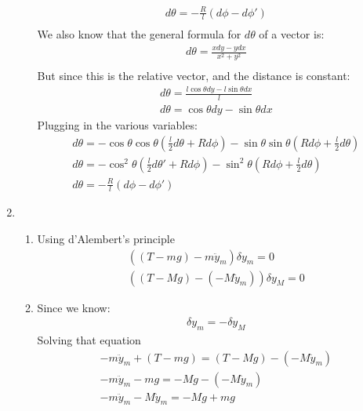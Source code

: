 \documentclass[12pt]{article}
\begin{document}
\begin{enumerate}
\begin{enumerate}
\begin{gather*}
                d\theta=-\frac{R}{l}(d\phi-d\phi')\\
            \end{gather*}
            We also know that the general formula for $d\theta$ of a vector is:
            \begin{gather*}
                d\theta=\frac{xdy-ydx}{x^2+y^2}\\
            \end{gather*}
            But since this is the relative vector, and the distance is constant:
            \begin{gather*}
                d\theta=\frac{l\cos\theta dy-l\sin\theta dx}{l}\\
                d\theta=\cos\theta dy-\sin\theta dx
            \end{gather*}
            Plugging in the various variables:
            \begin{gather*}
                d\theta=-\cos\theta \cos\theta\left(\frac{l}{2}d\theta+Rd\phi\right)-\sin\theta \sin\theta\left(Rd\phi+\frac{l}{2}d\theta\right)\\
                d\theta=-\cos^2\theta\left(\frac{l}{2}d\theta'+Rd\phi\right)- \sin^2\theta\left(Rd\phi+\frac{l}{2}d\theta\right)\\
                d\theta=-\frac{R}{l}(d\phi-d\phi')
            \end{gather*}
        \end{enumerate}
        \item
        \begin{enumerate}
            \item
            Using d'Alembert's principle
            \begin{gather*}
                ((T-mg)-m\ddot{y}_m)\delta y_m=0\\
                ((T-Mg)-(-M\ddot{y}_m))\delta y_M=0
            \end{gather*}
            \item
            Since we know:
            \begin{gather*}
                \delta y_m=-\delta y_M
            \end{gather*}
            Solving that equation
            \begin{gather*}
                -m\ddot{y}_m+(T-mg)=(T-Mg)-(-M\ddot{y}_m)\\
                -m\ddot{y}_m-mg=-Mg-(-M\ddot{y}_m)\\
                -m\ddot{y}_m-M\ddot{y}_m=-Mg+mg\\

\end{gather*}
\end{enumerate}
\end{enumerate}
\end{document}

